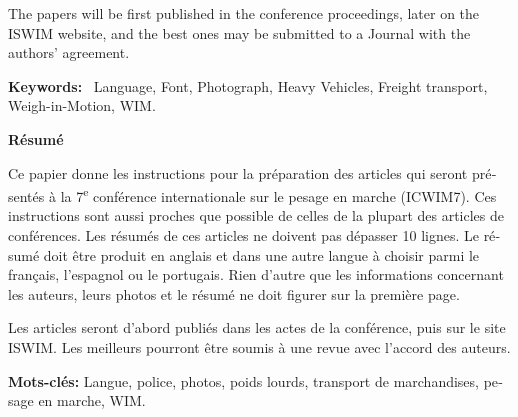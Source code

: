 \documentclass[a4paper]{article}
\newcommand\textstyletablecaptionCar[1]{\foreignlanguage{english}{\textbf{#1}}}
\begin{document}
\bigskip

{
The papers will be first published in the conference proceedings, later
on the ISWIM website, and the best ones may be submitted to a Journal
with the authors’ agreement.}


\bigskip

{
\textstyletablecaptionCar{Keywords:} \ Language, Font, Photograph, Heavy
Vehicles, Freight transport, Weigh-in-Motion, WIM.}


\bigskip

{\bfseries
\foreignlanguage{french}{Résumé}}

{
\foreignlanguage{french}{Ce papier donne les instructions pour la
préparation des articles qui seront présentés à la
7}\foreignlanguage{french}{\textsuperscript{e}}\foreignlanguage{french}{
conférence internationale sur le pesage en marche (ICWIM7). Ces
instructions sont aussi proches que possible de celles de la plupart
des articles de conférences. Les résumés de ces articles ne doivent pas
dépasser 10 lignes. Le résumé doit être produit en anglais et dans une
autre langue à choisir parmi le français, l’espagnol ou le portugais.
Rien d’autre que les informations concernant les auteurs, leurs photos
et le résumé ne doit figurer sur la première page.}}


\bigskip

{
\foreignlanguage{french}{Les articles seront d’abord publiés dans les
actes de la conférence, puis sur le site ISWIM. Les meilleurs pourront
être soumis à une revue avec l’accord des auteurs.}}


\bigskip

{
\textstyletablecaptionCar{\foreignlanguage{french}{Mots-clés:}}\foreignlanguage{french}{
Langue, police, photos, poids lourds, transport de marchandises, pesage
en marche, WIM.}}


\bigskip
\end{document}
